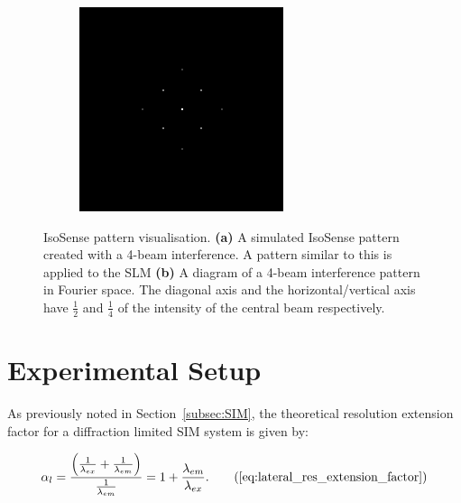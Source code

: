 \begin{figure}[h]
\begin{subfigure}{0.4\textwidth}
		\includegraphics[width=1\linewidth, scale=0.5]{./images/isosense_visualisation_ft.png}
		\caption{}
		\label{fig:isosense_visualisation_ft}
	\end{subfigure}
	\caption[IsoSense pattern visualisation.]{IsoSense pattern visualisation. \textbf{(a)} A simulated IsoSense pattern created with a 4-beam interference. A pattern similar to this is applied to the SLM \textbf{(b)} A diagram of a 4-beam interference pattern in Fourier space. The diagonal axis and the horizontal/vertical axis have $\frac{1}{2}$ and $\frac{1}{4}$ of the intensity of the central beam respectively.}
	\label{fig:isosense_visualisation}
\end{figure}

\section{Experimental Setup}
\label{sec:DeepSIM_setup}

As previously noted in Section~\ref{subsec:SIM}, the theoretical resolution 
extension factor for a diffraction limited SIM system is given by:

\begin{equation}
\alpha_{l} = \frac{\left(\frac{1}{\lambda_{ex}} + \frac{1}{\lambda_{em}}\right)}{\frac{1}{\lambda_{em}}} = 1 + \frac{\lambda_{em}}{\lambda_{ex}}.\tag{\ref{eq:lateral_res_extension_factor}}
\end{equation}

